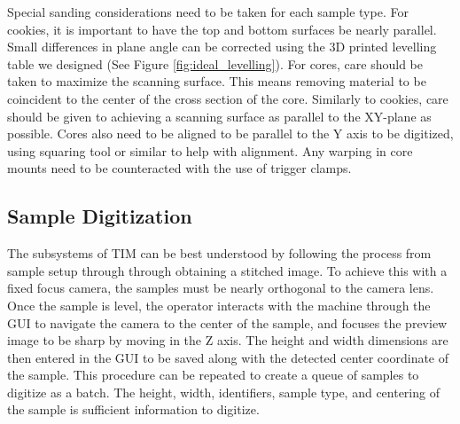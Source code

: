 \documentclass[a4paper,12pt]{article}
\begin{document}
Special sanding considerations need to be taken for each sample type. 
For cookies, it is important to have the top and bottom surfaces be nearly parallel. Small differences in plane angle can be corrected using the 3D printed levelling table we designed (See Figure \ref{fig:ideal_levelling}). 
For cores, care should be taken to maximize the scanning surface. This means removing material to be coincident to the center of the cross section of the core. 
Similarly to cookies, care should be given to achieving a  scanning surface as parallel to the XY-plane as possible.
Cores also need to be aligned to be parallel to the Y axis to be digitized, using squaring tool or similar to help with alignment. Any warping in core mounts need to be counteracted with the use of trigger clamps. 

\subsection{Sample Digitization} %
The subsystems of TIM can be best understood by following the process from sample setup through through obtaining a stitched image. 
To achieve this with a fixed focus camera, the samples must be nearly orthogonal to the camera lens. 
Once the sample is level, the operator interacts with the machine through the GUI to navigate the camera to the center of the sample, and focuses the preview image to be sharp by moving in the Z axis. The height and width dimensions are then entered in the GUI
to be saved along with the detected center coordinate of the sample. This procedure can be repeated to create a queue of samples to digitize as a batch.
The height, width, identifiers, sample type, and centering of the sample is sufficient information to digitize.
\end{document}
